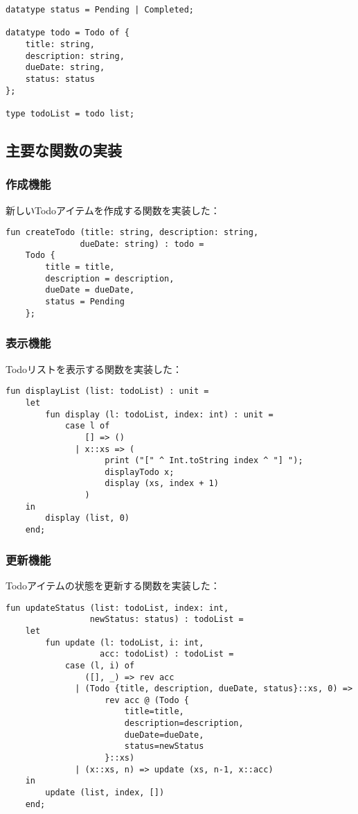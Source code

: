 \documentclass[autodetect-engine,
dvi=dvipdfmx,ja=standard,
               a4j,11pt]{bxjsarticle}
\begin{document}
\begin{verbatim}
datatype status = Pending | Completed;

datatype todo = Todo of {
    title: string,
    description: string,
    dueDate: string,
    status: status
};

type todoList = todo list;
\end{verbatim}

\subsection{主要な関数の実装}
\subsubsection{作成機能}
新しいTodoアイテムを作成する関数を実装した：

\begin{verbatim}
fun createTodo (title: string, description: string, 
               dueDate: string) : todo =
    Todo {
        title = title,
        description = description,
        dueDate = dueDate,
        status = Pending
    };
\end{verbatim}

\subsubsection{表示機能}
Todoリストを表示する関数を実装した：

\begin{verbatim}
fun displayList (list: todoList) : unit =
    let
        fun display (l: todoList, index: int) : unit =
            case l of
                [] => ()
              | x::xs => (
                    print ("[" ^ Int.toString index ^ "] ");
                    displayTodo x;
                    display (xs, index + 1)
                )
    in
        display (list, 0)
    end;
\end{verbatim}

\subsubsection{更新機能}
Todoアイテムの状態を更新する関数を実装した：

\begin{verbatim}
fun updateStatus (list: todoList, index: int, 
                 newStatus: status) : todoList =
    let
        fun update (l: todoList, i: int, 
                   acc: todoList) : todoList =
            case (l, i) of
                ([], _) => rev acc
              | (Todo {title, description, dueDate, status}::xs, 0) =>
                    rev acc @ (Todo {
                        title=title, 
                        description=description, 
                        dueDate=dueDate, 
                        status=newStatus
                    }::xs)
              | (x::xs, n) => update (xs, n-1, x::acc)
    in
        update (list, index, [])
    end;
\end{verbatim}
\end{document}
